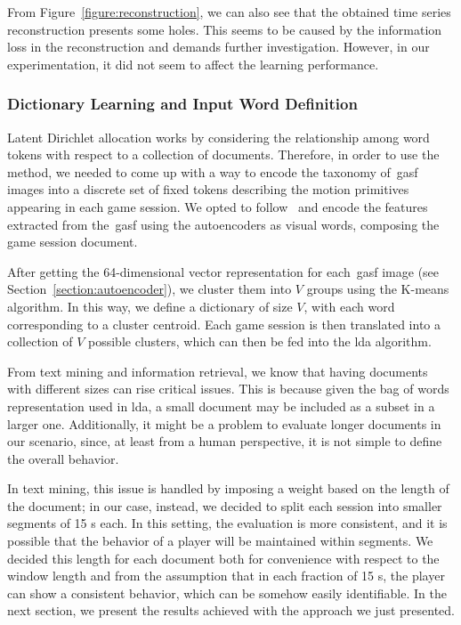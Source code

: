 From Figure~\ref{figure:reconstruction}, we can also see that the obtained time series reconstruction presents some holes. This seems to be caused by the information loss in the reconstruction and demands further investigation. However, in our experimentation, it did not seem to affect the learning performance. 

\subsubsection{Dictionary Learning and Input Word Definition}
Latent Dirichlet allocation works by considering the relationship among word tokens with respect to a collection of documents. Therefore, in order to use the method, we needed to come up with a way to encode the taxonomy of~\gls{gasf} images into a discrete set of fixed tokens describing the motion primitives appearing in each game session. We opted to follow~\cite{prince_computer_2012} and encode the features extracted from the~\gls{gasf} using the autoencoders as visual words, composing the game session document.

After getting the 64-dimensional vector representation for each~\gls{gasf} image (see Section~\ref{section:autoencoder}), we cluster them into $V$ groups using the K-means algorithm. In this way, we define a dictionary of size $V$, with each word corresponding to a cluster centroid. Each game session is then translated into a collection of $V$ possible clusters, which can then be fed into the \gls{lda} algorithm.

From text mining and information retrieval, we know that having documents with different sizes can rise critical issues. This is because given the bag of words representation used in \gls{lda}, a small document may be included as a subset in a larger one. Additionally, it might be a problem to evaluate longer documents in our scenario, since, at least from a human perspective, it is not simple to define the overall behavior. %

In text mining, this issue is handled by imposing a weight based on the length of the document; in our case, instead, we decided to split each session into smaller segments of 15 s each. In this setting, the evaluation is more consistent, and it is possible that the behavior of a player will be maintained within segments. We decided this length for each document both for convenience with respect to the window length and from the assumption that in each fraction of 15 s, the player can show a consistent behavior, which can be somehow easily identifiable. In the next section, we present the results achieved with the approach we just presented.

